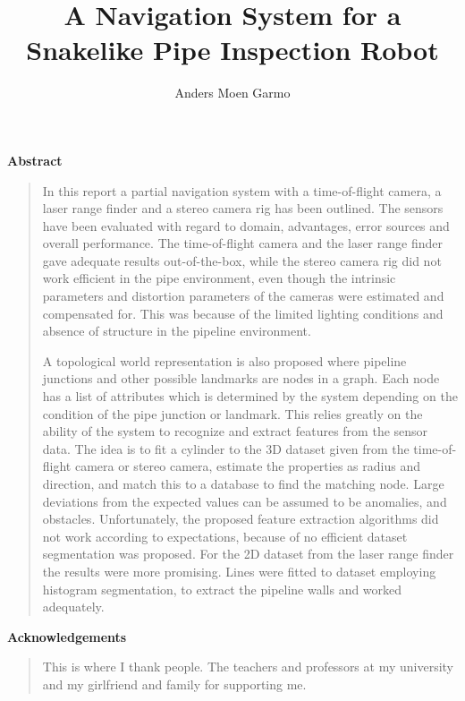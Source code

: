 \documentclass[twoside, a4paper, 12pt]{book}
\title{A Navigation System for a Snakelike Pipe Inspection Robot}
\author{Anders Moen Garmo}
\numberwithin{algorithm}{chapter}
\newenvironment{acknowledgements}
{\pagestyle{empty}
\begin{center}
\vspace*{1.5cm}
{\Large \bfseries Acknowledgements}
\end{center}
\vspace{0.5cm}
\begin{quote}}
{\end{quote}}
\newenvironment{abstracts} { \pagestyle{empty}
  \begin{center}
  \vspace*{1.5cm}
  {\Large \bfseries  Abstract}
  \end{center}
  \vspace{0.5cm}
   \begin{quote}}
{\end{quote}}
\begin{document}

\maketitle  %



\begin{abstracts}
In this report a partial navigation system with a time-of-flight camera, a laser range
finder and a stereo camera rig has been outlined. The sensors have been evaluated with
regard to domain, advantages, error sources and overall performance. The time-of-flight camera and the
laser range finder gave adequate results out-of-the-box, while the stereo camera rig did
not work efficient in the pipe environment, even though the intrinsic parameters and distortion
parameters of the cameras were estimated and compensated for. This was because of the limited lighting
conditions and absence of structure in the pipeline environment. 

A topological world representation is also proposed where pipeline junctions and other
possible landmarks are nodes in a graph. Each node has a list of attributes which is
determined by the system depending on the condition of the pipe junction or landmark. This
relies greatly on the ability of the system to recognize and extract features from the
sensor data. The idea is to fit a cylinder to the 3D dataset given from the time-of-flight
camera or stereo camera, estimate the properties as radius and direction, and match this
to a database to find the matching node. Large deviations from the expected values can be
assumed to be anomalies, and obstacles. 
Unfortunately, the proposed feature extraction algorithms did not work
according to expectations, because of no efficient dataset segmentation was proposed. For
the 2D dataset from the laser range finder the results were more promising. Lines were
fitted to dataset employing histogram segmentation, to extract the pipeline walls and
worked adequately. 

\end{abstracts}

\frontmatter

\begin{acknowledgements}
    This is where I thank people. The teachers and professors at my university and my
    girlfriend and family for supporting me.
\end{acknowledgements}
\end{document}
